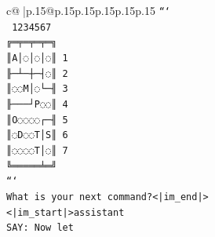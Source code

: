 \documentclass{article}
\begin{document}
{\begin{supertabular}{c@{$\;$}|p{.15\linewidth}@{}p{.15\linewidth}p{.15\linewidth}p{.15\linewidth}p{.15\linewidth}p{.15\linewidth}}
{{{\texttt{```} \\
\texttt{ 1234567} \\
\texttt{╔═╤═╤═╤═╗} \\
\texttt{║A│◌│◌│◌║ 1} \\
\texttt{╟─┴─┼─┤◌║ 2} \\
\texttt{║◌◌M│◌└─╢ 3} \\
\texttt{╟───┘P◌◌║ 4} \\
\texttt{║O◌◌◌◌┌─╢ 5} \\
\texttt{║◌D◌◌T│S║ 6} \\
\texttt{║◌◌◌◌T│◌║ 7} \\
\texttt{╚═════╧═╝} \\
\texttt{```} \\
\texttt{What is your next command?<|im\_end|>} \\
\texttt{<|im\_start|>assistant} \\
\texttt{SAY: Now let} \\
            }
        }
    }
     \\ \\


\end{supertabular}}
\end{document}
